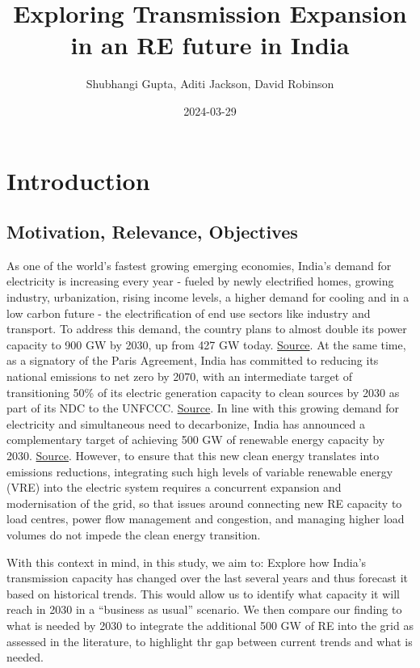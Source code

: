 \documentclass[
]{article}
\title{Exploring Transmission Expansion in an RE future in India}
\author{Shubhangi Gupta, Aditi Jackson, David Robinson}
\date{2024-03-29}
\begin{document}
\maketitle

\hypertarget{introduction}{%
\section{Introduction}\label{introduction}}

\hypertarget{motivation-relevance-objectives}{%
\subsection{Motivation, Relevance,
Objectives}\label{motivation-relevance-objectives}}

As one of the world's fastest growing emerging economies, India's demand
for electricity is increasing every year - fueled by newly electrified
homes, growing industry, urbanization, rising income levels, a higher
demand for cooling and in a low carbon future - the electrification of
end use sectors like industry and transport. To address this demand, the
country plans to almost double its power capacity to 900 GW by 2030, up
from 427 GW today.
\href{https://energy.economictimes.indiatimes.com/news/power/indias-power-demand-projected-to-reach-366-gw-by-2030-capacity-expansion-to-900-gw-targeted/106971394}{Source}.
At the same time, as a signatory of the Paris Agreement, India has
committed to reducing its national emissions to net zero by 2070, with
an intermediate target of transitioning 50\% of its electric generation
capacity to clean sources by 2030 as part of its NDC to the UNFCCC.
\href{https://unfccc.int/sites/default/files/NDC/2022-08/India\%20Updated\%20First\%20Nationally\%20Determined\%20Contrib.pdf}{Source}.
In line with this growing demand for electricity and simultaneous need
to decarbonize, India has announced a complementary target of achieving
500 GW of renewable energy capacity by 2030.
\href{https://www.reuters.com/article/idUSKCN1TQ1QW/}{Source}. However,
to ensure that this new clean energy translates into emissions
reductions, integrating such high levels of variable renewable energy
(VRE) into the electric system requires a concurrent expansion and
modernisation of the grid, so that issues around connecting new RE
capacity to load centres, power flow management and congestion, and
managing higher load volumes do not impede the clean energy transition.

With this context in mind, in this study, we aim to: Explore how India's
transmission capacity has changed over the last several years and thus
forecast it based on historical trends. This would allow us to identify
what capacity it will reach in 2030 in a ``business as usual'' scenario.
We then compare our finding to what is needed by 2030 to integrate the
additional 500 GW of RE into the grid as assessed in the literature, to
highlight thr gap between current trends and what is needed.
\end{document}
